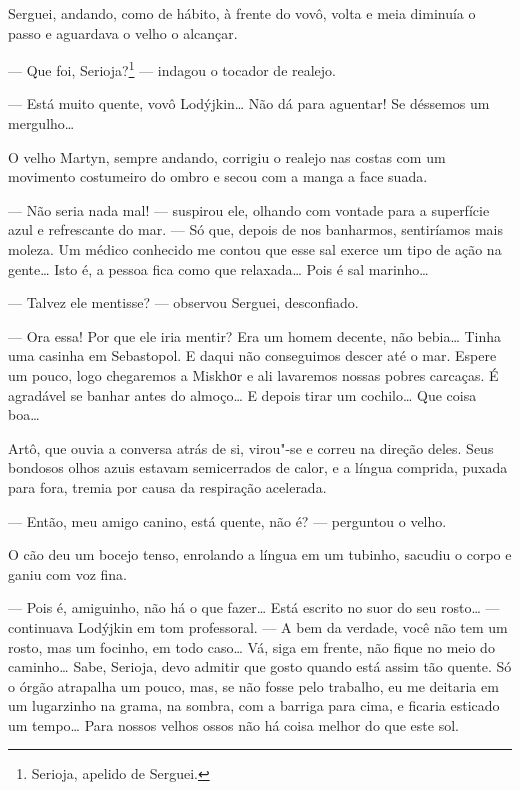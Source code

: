 Serguei, andando, como de hábito, à frente do vovô, volta e meia
diminuía o passo e aguardava o velho o alcançar.

--- Que foi, Serioja?\footnote{Serioja, apelido de Serguei.} --- indagou
o tocador de realejo.

--- Está muito quente, vovô Lodýjkin\ldots{} Não dá para aguentar! Se
déssemos um mergulho\ldots{}

O velho Martyn, sempre andando, corrigiu o realejo nas costas com um
movimento costumeiro do ombro e secou com a manga a face suada.

--- Não seria nada mal! --- suspirou ele, olhando com vontade para a
superfície azul e refrescante do mar. --- Só que, depois de nos
banharmos, sentiríamos mais moleza. Um médico conhecido me contou que
esse sal exerce um tipo de ação na gente\ldots{} Isto é, a pessoa fica como
que relaxada\ldots{} Pois é sal marinho\ldots{}

--- Talvez ele mentisse? --- observou Serguei, desconfiado.

--- Ora essa! Por que ele iria mentir? Era um homem decente, não
bebia\ldots{} Tinha uma casinha em Sebastopol. E daqui não conseguimos descer
até o mar. Espere um pouco, logo chegaremos a Miskhоr e ali lavaremos
nossas pobres carcaças. É agradável se banhar antes do almoço\ldots{} E
depois tirar um cochilo\ldots{} Que coisa boa\ldots{}

Artô, que ouvia a conversa atrás de si, virou"-se e correu na direção
deles. Seus bondosos olhos azuis estavam semicerrados de calor, e a
língua comprida, puxada para fora, tremia por causa da respiração
acelerada.

--- Então, meu amigo canino, está quente, não é? --- perguntou o velho.

O cão deu um bocejo tenso, enrolando a língua em um tubinho, sacudiu o
corpo e ganiu com voz fina.

--- Pois é, amiguinho, não há o que fazer\ldots{} Está escrito no suor do seu
rosto\ldots{} --- continuava Lodýjkin em tom professoral. --- A bem da
verdade, você não tem um rosto, mas um focinho, em todo caso\ldots{} Vá, siga
em frente, não fique no meio do caminho\ldots{} Sabe, Serioja, devo admitir
que gosto quando está assim tão quente. Só o órgão atrapalha um pouco,
mas, se não fosse pelo trabalho, eu me deitaria em um lugarzinho na
grama, na sombra, com a barriga para cima, e ficaria esticado um
tempo\ldots{} Para nossos velhos ossos não há coisa melhor do que este sol.

